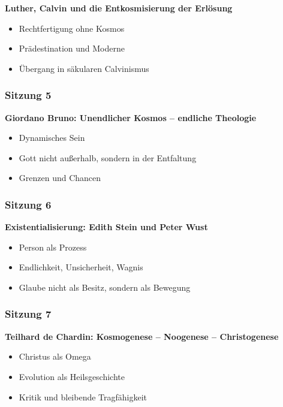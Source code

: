 \documentclass[
]{article}
\begin{document}
\textbf{Luther, Calvin und die Entkosmisierung der Erlösung}

\begin{itemize}
\item
  Rechtfertigung ohne Kosmos
\item
  Prädestination und Moderne
\item
  Übergang in säkularen Calvinismus
\end{itemize}

\subsubsection{\texorpdfstring{\textbf{Sitzung 5}}{Sitzung 5}}\label{sitzung-5}

\textbf{Giordano Bruno: Unendlicher Kosmos -- endliche Theologie}

\begin{itemize}
\item
  Dynamisches Sein
\item
  Gott nicht außerhalb, sondern in der Entfaltung
\item
  Grenzen und Chancen
\end{itemize}

\subsubsection{\texorpdfstring{\textbf{Sitzung 6}}{Sitzung 6}}\label{sitzung-6}

\textbf{Existentialisierung: Edith Stein und Peter Wust}

\begin{itemize}
\item
  Person als Prozess
\item
  Endlichkeit, Unsicherheit, Wagnis
\item
  Glaube nicht als Besitz, sondern als Bewegung
\end{itemize}

\subsubsection{\texorpdfstring{\textbf{Sitzung 7}}{Sitzung 7}}\label{sitzung-7}

\textbf{Teilhard de Chardin: Kosmogenese -- Noogenese -- Christogenese}

\begin{itemize}
\item
  Christus als Omega
\item
  Evolution als Heilsgeschichte
\item
  Kritik und bleibende Tragfähigkeit
\end{itemize}
\end{document}
